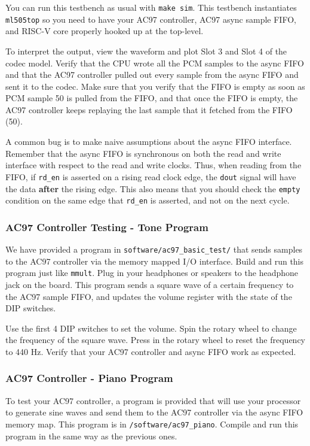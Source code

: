 \documentclass[11pt]{article}
\begin{document}
You can run this testbench as usual with \verb|make sim|. This testbench instantiates \verb|ml505top| so you need to have your AC97 controller, AC97 async sample FIFO, and RISC-V core properly hooked up at the top-level.

To interpret the output, view the waveform and plot Slot 3 and Slot 4 of the codec model. Verify that the CPU wrote all the PCM samples to the async FIFO and that the AC97 controller pulled out every sample from the async FIFO and sent it to the codec. Make sure that you verify that the FIFO is empty as soon as PCM sample 50 is pulled from the FIFO, and that once the FIFO is empty, the AC97 controller keeps replaying the last sample that it fetched from the FIFO (50).

A common bug is to make naive assumptions about the async FIFO interface. Remember that the async FIFO is synchronous on both the read and write interface with respect to the read and write clocks. Thus, when reading from the FIFO, if \verb|rd_en| is asserted on a rising read clock edge, the \verb|dout| signal will have the data \textbf{after} the rising edge. This also means that you should check the \verb|empty| condition on the same edge that \verb|rd_en| is asserted, and not on the next cycle.

\subsubsection{AC97 Controller Testing - Tone Program}
We have provided a program in \verb|software/ac97_basic_test/| that sends samples to the AC97 controller via the memory mapped I/O interface. Build and run this program just like \verb|mmult|. Plug in your headphones or speakers to the headphone jack on the board. This program sends a square wave of a certain frequency to the AC97 sample FIFO, and updates the volume register with the state of the DIP switches.

Use the first 4 DIP switches to set the volume. Spin the rotary wheel to change the frequency of the square wave. Press in the rotary wheel to reset the frequency to 440 Hz. Verify that your AC97 controller and async FIFO work as expected.

\subsubsection{AC97 Controller - Piano Program}
To test your AC97 controller, a program is provided that will use your processor to generate sine waves and send them to the AC97 controller via the async FIFO memory map. This program is in \verb|/software/ac97_piano|. Compile and run this program in the same way as the previous ones.
\end{document}

